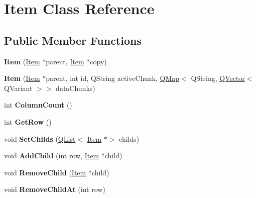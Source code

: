 \hypertarget{class_item}{}\section{Item Class Reference}
\label{class_item}
\subsection*{Public Member Functions}
\begin{DoxyCompactItemize}
\item 
\mbox{\label{class_item_aef96722ef425ab3794691db85ba4abd6}} 
{\bfseries Item} (\hyperlink{class_item}{Item} $\ast$parent, \hyperlink{class_item}{Item} $\ast$copy)
\item 
\mbox{\label{class_item_a27fb96423d6e35b384b226bc3408b348}} 
{\bfseries Item} (\hyperlink{class_item}{Item} $\ast$parent, int id, Q\+String active\+Chunk, \hyperlink{class_q_map}{Q\+Map}$<$ Q\+String, \hyperlink{class_q_vector}{Q\+Vector}$<$ Q\+Variant $>$$>$ data\+Chunks)
\item 
\mbox{\label{class_item_ae09610bc79b15b17cce0428661b14a88}} 
int {\bfseries Column\+Count} ()
\item 
\mbox{\label{class_item_adad3b372e59e9b033d3f8dc371fac651}} 
int {\bfseries Get\+Row} ()
\item 
\mbox{\label{class_item_a279eb94495d56f33e8779f1de7110681}} 
void {\bfseries Set\+Childs} (\hyperlink{class_q_list}{Q\+List}$<$ \hyperlink{class_item}{Item} $\ast$$>$ childs)
\item 
\mbox{\label{class_item_a6a98cb08e94548f37614132f663f5dfb}} 
void {\bfseries Add\+Child} (int row, \hyperlink{class_item}{Item} $\ast$child)
\item 
\mbox{\label{class_item_ab77ee89c1d573571d46276904ddea022}} 
void {\bfseries Remove\+Child} (\hyperlink{class_item}{Item} $\ast$child)
\item 
\mbox{\label{class_item_a88f43c96e836f5a1473763fd0e8846bb}} 
void {\bfseries Remove\+Child\+At} (int row)
\item 
\mbox{\label{class_item_a80ac5f26c6d125de147b2c5aae8631c7}} 

\end{DoxyCompactItemize}
